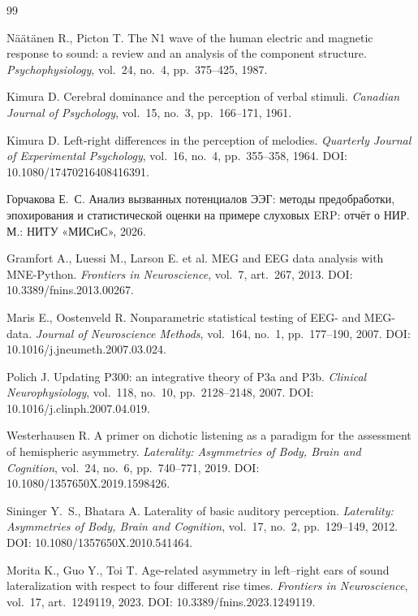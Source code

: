 \documentclass{misisarticle}
\begin{document}
\begin{thebibliography}{99}

 Näätänen R., Picton T. The N1 wave of the human electric and magnetic response to sound: a review and an analysis of the component structure. \textit{Psychophysiology}, vol.~24, no.~4, pp.~375--425, 1987.

 Kimura D. Cerebral dominance and the perception of verbal stimuli. \textit{Canadian Journal of Psychology}, vol.~15, no.~3, pp.~166--171, 1961.

 Kimura D. Left-right differences in the perception of melodies. \textit{Quarterly Journal of Experimental Psychology}, vol.~16, no.~4, pp.~355--358, 1964. DOI: 10.1080/17470216408416391.

 Горчакова Е.~С. Анализ вызванных потенциалов ЭЭГ: методы предобработки, эпохирования и статистической оценки на примере слуховых ERP: отчёт о НИР. М.: НИТУ «МИСиС», 2026.

 Gramfort A., Luessi M., Larson E. et al. MEG and EEG data analysis with MNE-Python. \textit{Frontiers in Neuroscience}, vol.~7, art.~267, 2013. DOI: 10.3389/fnins.2013.00267.

 Maris E., Oostenveld R. Nonparametric statistical testing of EEG- and MEG-data. \textit{Journal of Neuroscience Methods}, vol.~164, no.~1, pp.~177--190, 2007. DOI: 10.1016/j.jneumeth.2007.03.024.

 Polich J. Updating P300: an integrative theory of P3a and P3b. \textit{Clinical Neurophysiology}, vol.~118, no.~10, pp.~2128--2148, 2007. DOI: 10.1016/j.clinph.2007.04.019.

 Westerhausen R. A primer on dichotic listening as a paradigm for the assessment of hemispheric asymmetry. \textit{Laterality: Asymmetries of Body, Brain and Cognition}, vol.~24, no.~6, pp.~740--771, 2019. DOI: 10.1080/1357650X.2019.1598426.

 Sininger Y.~S., Bhatara A. Laterality of basic auditory perception. \textit{Laterality: Asymmetries of Body, Brain and Cognition}, vol.~17, no.~2, pp.~129--149, 2012. DOI: 10.1080/1357650X.2010.541464.

 Morita K., Guo Y., Toi T. Age-related asymmetry in left--right ears of sound lateralization with respect to four different rise times. \textit{Frontiers in Neuroscience}, vol.~17, art.~1249119, 2023. DOI: 10.3389/fnins.2023.1249119.


\end{thebibliography}
\end{document}
